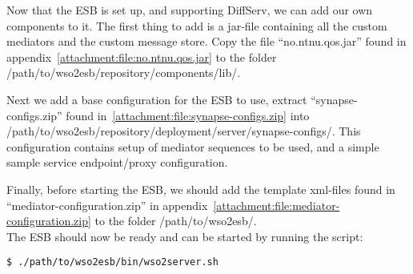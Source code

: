 	Now that the ESB is set up, and supporting DiffServ, we can add our own components to it. The first thing to add is a jar-file containing all the custom mediators and the custom message store. Copy the file “no.ntnu.qos.jar” found in appendix~\ref{attachment:file:no.ntnu.qos.jar} to the folder /path/to/wso2esb/repository/components/lib/.
	
	Next we add a base configuration for the ESB to use, extract “synapse-configs.zip” found in~\ref{attachment:file:synapse-configs.zip} into /path/to/wso2esb/repository/deployment/server/synapse-configs/. This configuration contains setup of mediator sequences to be used, and a simple sample service endpoint/proxy configuration.
	
	Finally, before starting the ESB, we should add the template xml-files found in “mediator-configuration.zip” in appendix~\ref{attachment:file:mediator-configuration.zip} to the folder /path/to/wso2esb/.\\

	The ESB should now be ready and can be started by running the script:\\
\begin{lstlisting}[frame=single, label=run esb server, breaklines=true]
$ ./path/to/wso2esb/bin/wso2server.sh
\end{lstlisting}
